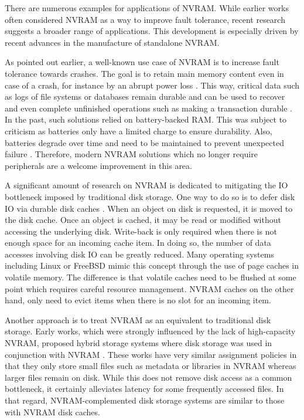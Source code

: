 There are numerous examples for applications of \ac{NVRAM}. While earlier works
often considered \ac{NVRAM} as a way to improve fault tolerance, recent research
suggests a broader range of applications. This development is especially driven
by recent advances in the manufacture of standalone \ac{NVRAM}.

As pointed out earlier, a well-known use case of \ac{NVRAM} is to increase fault
tolerance towards crashes. The goal is to retain main memory content even in
case of a crash, for instance by an abrupt power loss \cite{molina1992main,
eich1986main}. This way, critical data such as logs of file systems or databases
remain durable and can be used to recover and even complete unfinished
operations such as making a transaction durable \cite{liskov1991replication,
chen1996rio}. In the past, such solutions relied on battery-backed \ac{RAM}.
This was subject to criticism as batteries only have a limited charge to ensure
durability. Also, batteries degrade over time and need to be maintained to
prevent unexpected failure \cite{molina1992main}. Therefore, modern \ac{NVRAM}
solutions which no longer require peripherals are a welcome improvement in this
area.

A significant amount of research on \ac{NVRAM} is dedicated to mitigating the
\ac{IO} bottleneck imposed by traditional disk storage. One way to do so is to
defer disk \ac{IO} via durable disk caches \cite{chen1996rio, wu1994envy}. When
an object on disk is requested, it is moved to the disk cache. Once an object is
cached, it may be read or modified without accessing the underlying disk.
Write-back is only required when there is not enough space for an incoming cache
item. In doing so, the number of data accesses involving disk \ac{IO} can be
greatly reduced. Many operating systems including Linux or FreeBSD mimic this
concept through the use of page caches in volatile memory. The difference is
that volatile caches need to be flushed at some point which requires careful
resource management. \ac{NVRAM} caches on the other hand, only need to evict
items when there is no slot for an incoming item.

Another approach is to treat \ac{NVRAM} as an equivalent to traditional disk
storage. Early works, which were strongly influenced by the lack of
high-capacity \ac{NVRAM}, proposed hybrid storage systems where disk storage was
used in conjunction with \ac{NVRAM} \cite{wang2002conquest, miller2001hermes}.
These works have very similar assignment policies in that they only store small
files such as metadata or libraries in \ac{NVRAM} whereas larger files remain on
disk. While this does not remove disk access as a common bottleneck, it
certainly alleviates latency for some frequently accessed files. In that regard,
\ac{NVRAM}-complemented disk storage systems are similar to those with
\ac{NVRAM} disk caches.

